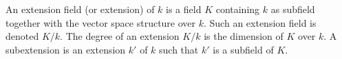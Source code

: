 An extension field (or extension) of $k$ is a field $K$ containing $k$ as subfield together with the vector space structure over $k$. Such an extension field is denoted $K/k$. The degree of an extension $K/k$ is the dimension of $K$ over $k$. A subextension is an extension $k'$ of $k$ such that $k'$ is a subfield of $K$.

